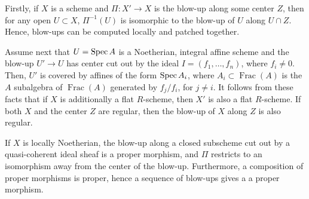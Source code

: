 Firstly, if $X$ is a scheme and $\Pi: X' \to X$ is the blow-up along some center $Z$, then for any open $U \subset X$, $\Pi^{-1}(U)$ is isomorphic to the blow-up of $U$ along $U \cap Z$.
Hence, blow-ups can be computed locally and patched together.

Assume next that $U = \operatorname{Spec} A$ is a Noetherian, integral affine scheme and the blow-up $U' \to U$ has center cut out by the ideal $I = (f_1, \dots, f_n)$, where $f_i \neq 0$.
Then, $U'$ is covered by affines of the form $\operatorname{Spec} A_i$, where $A_i \subset \operatorname{Frac}(A)$ is the $A$ subalgebra of $\operatorname{Frac}(A)$ generated by $f_j/f_i$, for $j \neq i$.
It follows from these facts that if $X$ is additionally a flat $R$-scheme, then $X'$ is also a flat $R$-scheme.
If both $X$ and the center $Z$ are regular, then the blow-up of $X$ along $Z$ is also regular.

If $X$ is locally Noetherian, the blow-up along a closed subscheme cut out by a quasi-coherent ideal sheaf is a proper morphism, and $\Pi$ restricts to an isomorphism away from the center of the blow-up.
Furthermore, a composition of proper morphisms is proper, hence a sequence of blow-ups gives a a proper morphism.

